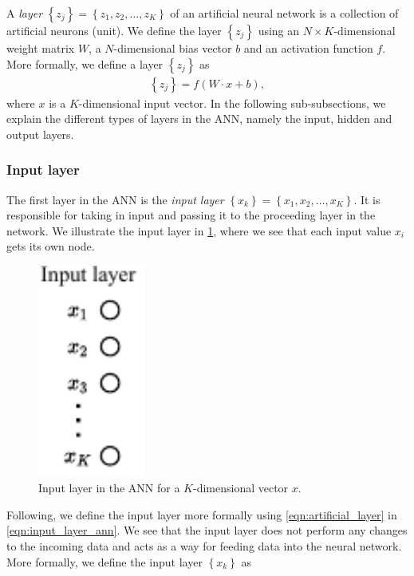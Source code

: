 \newcommand{\layer}[2]{\left\{ {#1}_{#2} \right\}}

A \textit{layer} $\layer{z}{j} = \left\{ z_1, z_2, \ldots, z_K \right\}$ of an artificial neural network is a collection of artificial neurons (unit). We define the layer $\layer{z}{j}$ using an $N \times K$-dimensional weight matrix $W$, a $N$-dimensional bias vector $b$ and an activation function $f$. More formally, we define a layer $\layer{z}{j}$ as
\begin{align}
    \layer{z}{j} = f \left( W \cdot x + b \right),
    \label{eqn:artificial_layer}
\end{align}
where $x$ is a $K$-dimensional input vector. In the following sub-subsections, we explain the different types of layers in the ANN, namely the input, hidden and output layers.

\subsubsection{Input layer}
\label{sec:ann-input-layer}
The first layer in the ANN is the \textit{input layer} $\layer{x}{k} = \left\{ x_1, x_2, \ldots, x_K \right\}$. It is responsible for taking in input and passing it to the proceeding layer in the network. We illustrate the input layer in \cref{fig:input_layer_ann}, where we see that each input value $x_i$ gets its own node.
\begin{figure}[H]
    \centering
    \includegraphics[height=7cm]{thesis/figures/artificial-neural-network-input-layer_cropped.pdf}
    \caption{Input layer in the ANN for a $K$-dimensional vector $x$.}
    \label{fig:input_layer_ann}
\end{figure}
Following, we define the input layer more formally using \cref{eqn:artificial_layer} in \cref{eqn:input_layer_ann}. We see that the input layer does not perform any changes to the incoming data and acts as a way for feeding data into the neural network. More formally, we define the input layer $\layer{x}{k}$ as
